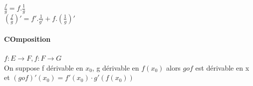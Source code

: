 			$\frac{f}{g} = f . \frac{1}{g}$ ~\\
			$(\frac{f}{g})' = f'.\frac{1}{g'} + f.(\frac{1}{g})'$

			\paragraph{COmposition} $f:E \rightarrow F, f : F \rightarrow G$ ~\\
			On suppose f dérivable en $x_0$, g dérivable en $f(x_0)$ alors $gof$ est dérivable en x et $(gof)'(x_0) = f'(x_0)\cdot g'(f(x_0))$
